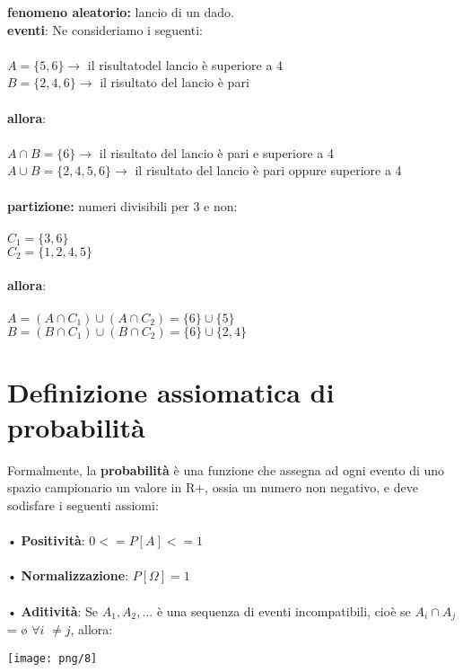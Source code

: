 \documentclass[12pt, letterpaper]{article}
\begin{document}
\textbf{fenomeno aleatorio:} lancio di un dado.
\\
\textbf{eventi}: Ne consideriamo i seguenti:\\\\
$ A = \{5,6\} \rightarrow $ il risultatodel lancio è superiore a 4\\
$ B = \{2,4,6\} \rightarrow $ il risultato del lancio è pari
\\\\
\textbf{allora}:
\\\\
$ A \cap B = \{6\} \rightarrow $ il risultato del lancio è pari e superiore a 4\\
$ A \cup B = \{2,4,5,6\} \rightarrow $ il risultato del lancio è pari oppure superiore a 4\\
\\
\textbf{partizione:} numeri divisibili per 3 e non:
\\
\\
$ C_1 = \{3,6\}$\\
$ C_2 = \{1,2,4,5\} $
\\
\\
\textbf{allora}:
\\
\\
$ A = (A \cap C_1)\cup(A \cap C_2) = \{6\}\cup \{5\}$
\\
$ B = (B \cap C_1)\cup(B \cap C_2) = \{6\} \cup \{2,4\}$

\newpage 

\section{Definizione assiomatica di probabilità}

Formalmente, la \textbf{probabilità} è una funzione che assegna ad ogni evento di
uno spazio campionario un valore in R+, ossia un numero non negativo, e
deve sodisfare i seguenti assiomi:
\\\\
• \textbf{Positività}: $0 <= P [A] <= 1$\\\\
• \textbf{Normalizzazione}: $P [\Omega] = 1$\\\\
• \textbf{Aditività}: Se $A_1, A_2, ...$ è una sequenza di eventi incompatibili, cioè se $A_i \cap A_j $= ø $\forall i$ $\not = j$, allora:
\begin{center}
\texttt{[image: png/8]}\\
\end{center}
\end{document}

